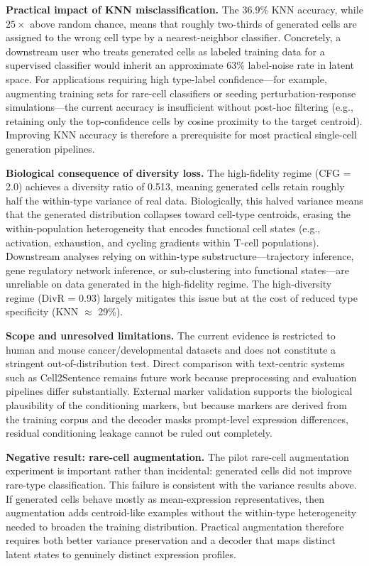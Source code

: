 \documentclass[preprint,12pt]{elsarticle}
\begin{document}
\textbf{Practical impact of KNN misclassification.} The 36.9\% KNN accuracy, while $25\times$ above random chance, means that roughly two-thirds of generated cells are assigned to the wrong cell type by a nearest-neighbor classifier. Concretely, a downstream user who treats generated cells as labeled training data for a supervised classifier would inherit an approximate 63\% label-noise rate in latent space. For applications requiring high type-label confidence---for example, augmenting training sets for rare-cell classifiers or seeding perturbation-response simulations---the current accuracy is insufficient without post-hoc filtering (e.g., retaining only the top-confidence cells by cosine proximity to the target centroid). Improving KNN accuracy is therefore a prerequisite for most practical single-cell generation pipelines.

\textbf{Biological consequence of diversity loss.} The high-fidelity regime (CFG = 2.0) achieves a diversity ratio of 0.513, meaning generated cells retain roughly half the within-type variance of real data. Biologically, this halved variance means that the generated distribution collapses toward cell-type centroids, erasing the within-population heterogeneity that encodes functional cell states (e.g., activation, exhaustion, and cycling gradients within T-cell populations). Downstream analyses relying on within-type substructure---trajectory inference, gene regulatory network inference, or sub-clustering into functional states---are unreliable on data generated in the high-fidelity regime. The high-diversity regime (DivR = 0.93) largely mitigates this issue but at the cost of reduced type specificity (KNN $\approx$ 29\%).

\textbf{Scope and unresolved limitations.}\label{sec:limitations} The current evidence is restricted to human and mouse cancer/developmental datasets and does not constitute a stringent out-of-distribution test. Direct comparison with text-centric systems such as Cell2Sentence remains future work because preprocessing and evaluation pipelines differ substantially. External marker validation supports the biological plausibility of the conditioning markers, but because markers are derived from the training corpus and the decoder masks prompt-level expression differences, residual conditioning leakage cannot be ruled out completely.

\textbf{Negative result: rare-cell augmentation.} The pilot rare-cell augmentation experiment is important rather than incidental: generated cells did not improve rare-type classification. This failure is consistent with the variance results above. If generated cells behave mostly as mean-expression representatives, then augmentation adds centroid-like examples without the within-type heterogeneity needed to broaden the training distribution. Practical augmentation therefore requires both better variance preservation and a decoder that maps distinct latent states to genuinely distinct expression profiles.
\end{document}
